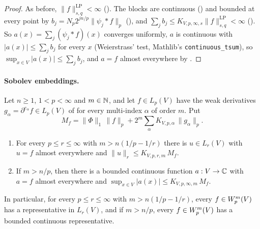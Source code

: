 \begin{proof}
\leanok
As before, $\|f\|^{\mathrm{LP}}_{s,q} < \infty$ (). The blocks are continuous
() and bounded at every point by
$b_j = N_p 2^{jn/p} \|\psi_j * f\|_p$ (), and
$\sum_j b_j \leq K_{V,p,\infty,s} \|f\|^{\mathrm{LP}}_{s,q} < \infty$
(). So $a(x) = \sum_j (\psi_j * f)(x)$ converges uniformly,
$a$ is continuous with $|a(x)| \leq \sum_j b_j$ for every $x$ (Weierstrass' test, Mathlib's
\texttt{continuous\_\allowbreak tsum}), so $\sup_{x \in V} |a(x)| \leq \sum_j b_j$, and $a = f$
almost everywhere by .
\end{proof}

\paragraph{Sobolev embeddings.}

\begin{corollary}
\label{cor:sobolev-embedding}
\leanok
{}
Let $n \geq 1$, $1 < p < \infty$ and $m \in \mathbb{N}$, and let $f \in L_p(V)$ have the weak
derivatives $g_\alpha = \partial^{e_\alpha} f \in L_p(V)$ of 
for every multi-index $\alpha$ of order $m$. Put
\[
  M_f = \|\Phi\|_1 \, \|f\|_p + 2^m \sum_\alpha K_{V,p,\alpha} \, \|g_\alpha\|_p .
\]
\begin{enumerate}
  \item For every $p \leq r \leq \infty$ with $m > n(1/p - 1/r)$ there is $u \in L_r(V)$ with
    $u = f$ almost everywhere and $\|u\|_r \leq K_{V,p,r,m} \, M_f$.
  \item If $m > n/p$, then there is a bounded continuous function $a : V \to \mathbb{C}$ with $a = f$
    almost everywhere and $\sup_{x \in V} |a(x)| \leq K_{V,p,\infty,m} \, M_f$.
\end{enumerate}
In particular, for every $p \leq r \leq \infty$ with $m > n(1/p - 1/r)$, every
$f \in W^{m}_{p}(V)$ has a representative in $L_r(V)$, and if $m > n/p$, every
$f \in W^{m}_{p}(V)$ has a bounded continuous representative.
\end{corollary}

